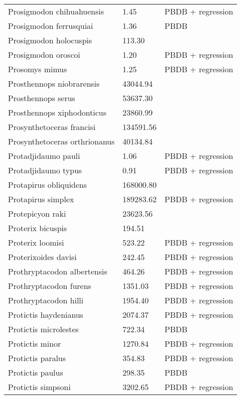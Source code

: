 \documentclass{article}
\begin{document}
\begin{center}
\begin{longtable}{p{} p{} p{}}
    Prosigmodon chihuahuensis & 1.45 & PBDB + regression \\ 
    Prosigmodon ferrusquiai & 1.36 & PBDB \\ 
    Prosigmodon holocuspis & 113.30 & \cite{Tomiya2013} \\ 
    Prosigmodon oroscoi & 1.20 & PBDB + regression \\ 
    Prosomys mimus & 1.25 & PBDB + regression \\ 
    Prosthennops niobrarensis & 43044.94 & \cite{Tomiya2013} \\ 
    Prosthennops serus & 53637.30 & \cite{Tomiya2013} \\ 
    Prosthennops xiphodonticus & 23860.99 & \cite{Tomiya2013} \\ 
    Prosynthetoceras francisi & 134591.56 & \cite{Tomiya2013} \\ 
    Prosynthetoceras orthrionanus & 40134.84 & \cite{Tomiya2013} \\ 
    Protadjidaumo pauli & 1.06 & PBDB + regression \\ 
    Protadjidaumo typus & 0.91 & PBDB + regression \\ 
    Protapirus obliquidens & 168000.80 & \cite{Rose1982a} \\ 
    Protapirus simplex & 189283.62 & PBDB + regression \\ 
    Protepicyon raki & 23623.56 & \cite{Tomiya2013} \\ 
    Proterix bicuspis & 194.51 & \cite{Coombs1979} \\ 
    Proterix loomisi & 523.22 & PBDB + regression \\ 
    Proterixoides davisi & 242.45 & PBDB + regression \\ 
    Prothryptacodon albertensis & 464.26 & PBDB + regression \\ 
    Prothryptacodon furens & 1351.03 & PBDB + regression \\ 
    Prothryptacodon hilli & 1954.40 & PBDB + regression \\ 
    Protictis haydenianus & 2074.37 & PBDB + regression \\ 
    Protictis microlestes & 722.34 & PBDB \\ 
    Protictis minor & 1270.84 & PBDB + regression \\ 
    Protictis paralus & 354.83 & PBDB + regression \\ 
    Protictis paulus & 298.35 & PBDB \\ 
    Protictis simpsoni & 3202.65 & PBDB + regression \\ 

\end{longtable}
\end{center}
\end{document}
